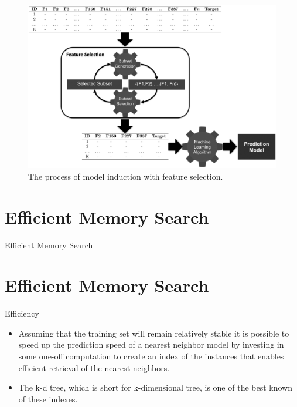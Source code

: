 \documentclass[xcolor={table}]{beamer}
\newcommand{\SectionSlideShortHeader}[3][]{
	\ifthenelse{\isempty{#1}}
		{\section[#3]{#2}\begin{frame} \begin{center}\begin{huge}#2\end{huge}\end{center}\end{frame}}
		{\section[#1]{#2}\begin{frame} \begin{center}\begin{huge}#3\end{huge}\end{center}\end{frame}}
}
\begin{document}
\begin{frame} [plain]
\begin{figure}
	\includegraphics[width=\textwidth]{./images/FeatureSelectionProcess_BW.pdf}
	\caption{The process of model induction with feature selection.}
	\label{fig:mlprocessfeatureselection}
\end{figure}
\end{frame} 

\SectionSlideShortHeader{Efficient Memory Search}{Efficiency}

\begin{frame}
\begin{itemize}
\item Assuming that the training set will remain relatively stable it is possible to speed up the prediction speed of a nearest neighbor model by investing in some one-off computation to create an index of the instances that enables efficient retrieval of the nearest neighbors. 
\item The \alert{k-d tree}, which is short for k-dimensional tree, is one of the best known of these indexes.
\end{itemize}
\end{frame} 
\end{document}
